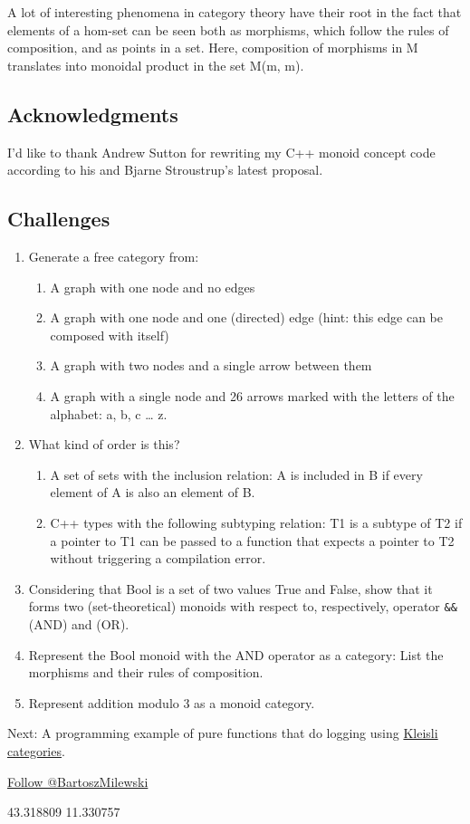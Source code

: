 A lot of interesting phenomena in category theory have their root in the
fact that elements of a hom-set can be seen both as morphisms, which
follow the rules of composition, and as points in a set. Here,
composition of morphisms in M translates into monoidal product in the
set M(m, m).

\subsection{Acknowledgments}\label{acknowledgments}

I'd like to thank Andrew Sutton for rewriting my C++ monoid concept code
according to his and Bjarne Stroustrup's latest proposal.

\subsection{Challenges}\label{challenges}

\begin{enumerate}
\tightlist
\item
  Generate a free category from:

  \begin{enumerate}
  \tightlist
  \item
    A graph with one node and no edges
  \item
    A graph with one node and one (directed) edge (hint: this edge can
    be composed with itself)
  \item
    A graph with two nodes and a single arrow between them
  \item
    A graph with a single node and 26 arrows marked with the letters of
    the alphabet: a, b, c \ldots{} z.
  \end{enumerate}
\item
  What kind of order is this?

  \begin{enumerate}
  \tightlist
  \item
    A set of sets with the inclusion relation: A is included in B if
    every element of A is also an element of B.
  \item
    C++ types with the following subtyping relation: T1 is a subtype of
    T2 if a pointer to T1 can be passed to a function that expects a
    pointer to T2 without triggering a compilation error.
  \end{enumerate}
\item
  Considering that Bool is a set of two values True and False, show that
  it forms two (set-theoretical) monoids with respect to, respectively,
  operator \texttt{\&\&} (AND) and \texttt{\textbar{}\textbar{}} (OR).
\item
  Represent the Bool monoid with the AND operator as a category: List
  the morphisms and their rules of composition.
\item
  Represent addition modulo 3 as a monoid category.
\end{enumerate}

Next: A programming example of pure functions that do logging using
\href{https://bartoszmilewski.com/2014/12/23/kleisli-categories/}{Kleisli
categories}.

\href{https://twitter.com/BartoszMilewski}{Follow @BartoszMilewski}

{43.318809} {11.330757}
